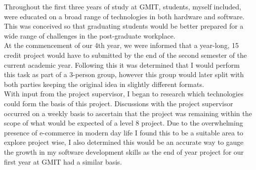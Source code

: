 Throughout the first three years of study at GMIT, students, myself included, were educated on a broad range of technologies in both hardware and software. This was conceived so that graduating students would be better prepared for a wide range of challenges in the post-graduate workplace.\\
At the commencement of our 4th year, we were informed that a year-long, 15 credit project would have to submitted by the end of the second semester of the current academic year. Following this it was determined that I would perform this task as part of a 3-person group, however this group would later split with both parties keeping the original idea in slightly different formats. \\
With input from the project supervisor, I began to research which technologies could form the basis of this project. Discussions with the project supervisor occurred on a weekly basis to ascertain that the project was remaining within the scope of what would be expected of a level 8 project. Due to the overwhelming presence of e-commerce in modern day life I found this to be a suitable area to explore project wise, I also determined this would be an accurate way to gauge the growth in my software development skills as the end of year project for our first year at GMIT had a similar basis. \\ \\

